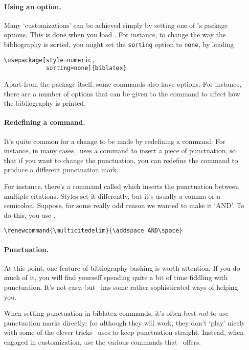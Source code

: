 \paragraph{Using an option.}
Many `customizations' can be achieved simply by setting one of
\biblatex's package options. This is done when you load \biblatex. For
instance, to change the way the bibliography is sorted, you might set
the \verb|sorting| option to \verb|none|, by loading
\begin{verbatim}
\usepackage[style=numeric,
            sorting=none]{biblatex}
\end{verbatim}

Apart from the package itself, some commands also have options. For
instance, there are a number of options that can be given to the
command to affect how the bibliography is printed.

\paragraph{Redefining a command.} It's quite common for a change to be
made by redefining a command. For instance, in many cases \biblatex\
uses a command to insert a piece of punctuation, so that if you want
to change the punctuation,\intref{See p~\pageref{sec:punctuation}.}
you can redefine the command to produce a different punctuation mark.

For instance, there's a command called  which
inserts the punctuation between multiple citations. Styles set it
differently, but it's usually a comma or a semicolon. Suppose, for
some really odd reason we wanted to make it `AND'. To do this, you use
\cs{renewcommand}.
\begin{verbatim}
\renewcommand{\multicitedelim}{\addspace AND\space}
\end{verbatim}

\paragraph{Punctuation.} At this point, one feature of
bibliography-bashing is worth attention. If you do much of it, you
will find yourself spending quite a bit of time fiddling with
punctuation. It's not easy, but \biblatex\ has some rather
sophisticated ways of helping you.

When setting punctuation in biblatex commands, it's often best
\emph{not} to use punctuation marks directly: for although they will
work, they don't `play' nicely with some of the clever tricks
\biblatex\ uses to keep punctuation straight. Instead, when engaged in
customization, use the various commands that \biblatex\ offers.

